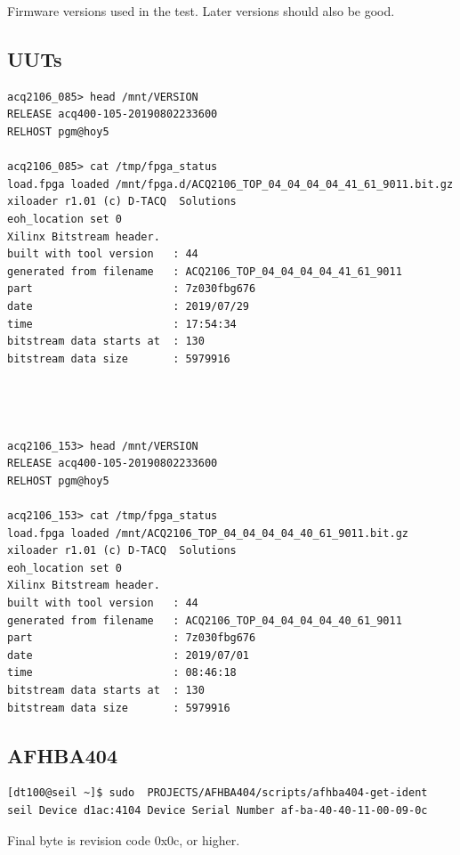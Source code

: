 \documentclass{article}
\begin{document}
Firmware versions used in the test. Later versions should also be good.

\subsection{UUTs}
\begin{verbatim}
acq2106_085> head /mnt/VERSION 
RELEASE acq400-105-20190802233600
RELHOST pgm@hoy5

acq2106_085> cat /tmp/fpga_status 
load.fpga loaded /mnt/fpga.d/ACQ2106_TOP_04_04_04_04_41_61_9011.bit.gz
xiloader r1.01 (c) D‑TACQ  Solutions
eoh_location set 0
Xilinx Bitstream header.
built with tool version   : 44
generated from filename   : ACQ2106_TOP_04_04_04_04_41_61_9011
part                      : 7z030fbg676
date                      : 2019/07/29
time                      : 17:54:34
bitstream data starts at  : 130
bitstream data size       : 5979916




acq2106_153> head /mnt/VERSION 
RELEASE acq400-105-20190802233600
RELHOST pgm@hoy5

acq2106_153> cat /tmp/fpga_status 
load.fpga loaded /mnt/ACQ2106_TOP_04_04_04_04_40_61_9011.bit.gz
xiloader r1.01 (c) D‑TACQ  Solutions
eoh_location set 0
Xilinx Bitstream header.
built with tool version   : 44
generated from filename   : ACQ2106_TOP_04_04_04_04_40_61_9011
part                      : 7z030fbg676
date                      : 2019/07/01
time                      : 08:46:18
bitstream data starts at  : 130
bitstream data size       : 5979916
\end{verbatim}

\subsection{AFHBA404}

\begin{verbatim}
[dt100@seil ~]$ sudo  PROJECTS/AFHBA404/scripts/afhba404-get-ident 
seil Device d1ac:4104 Device Serial Number af-ba-40-40-11-00-09-0c
\end{verbatim}
Final byte is revision code 0x0c, or higher.
\end{document}
